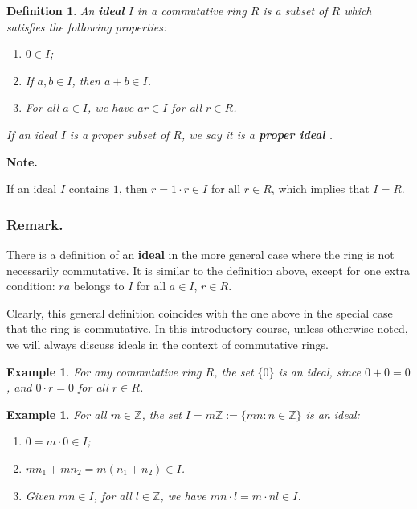 \documentclass[a4paper,12pt]{report}
\newcounter{statement}
\numberwithin{statement}{chapter}
\newtheorem{defn}[statement]{Definition}
\newtheorem{eg}[statement]{\bf Example}
\numberwithin{equation}{chapter}
\numberwithin{section}{chapter}
\numberwithin{subsection}{section}
\begin{document}
\begin{defn}
An  {\bf ideal}  $I$ in a commutative ring $R$ is a subset of $R$ which satisfies
the following properties:
\begin{enumerate}
\item 
$0 \in I$;

\item 
If $a, b \in I$, then $a + b \in I$.

\item 
For all $a \in I$, we have $ar \in I$ for all $r \in R$.
\end{enumerate}

If an ideal $I$ is a proper subset of $R$, we say it is a  {\bf proper ideal} .

\end{defn}




 {\bf Note.} 

If an ideal $I$ contains $1$, then $r = 1 \cdot r \in I$ for all $r \in R$,
which implies that $I = R$.






\subsubsection{Remark.}


There is a definition of an  {\bf ideal} 
in the more general case where the ring is not necessarily commutative.
It is similar to the definition above, except for one extra condition:
$ra$ belongs to $I$ for all $a \in I$, $r\in R$.

Clearly,
this general definition coincides with the one above in the special case that
the ring is commutative.
In this introductory course, unless otherwise noted,
we will always discuss ideals in the context of commutative rings.





\begin{eg}
For any commutative ring $R$, the set $\{0\}$ is an ideal,
since $0 + 0 = 0$, and $0\cdot r = 0$ for all $r \in R$.
\end{eg}



\begin{eg}

For all $m \in \mathbb{Z}$, the set $I = m\mathbb{Z}:=\{mn : n \in \mathbb{Z}\}$ is an ideal:
\begin{enumerate}
\item 
$0 = m\cdot 0 \in I$;

\item 
$mn_1 + mn_2 = m(n_1 + n_2) \in I$.

\item 
Given $mn \in I$, for all $l \in \mathbb{Z}$, we have $mn\cdot l = m \cdot nl \in I$.
\end{enumerate}

\end{eg}
\end{document}

